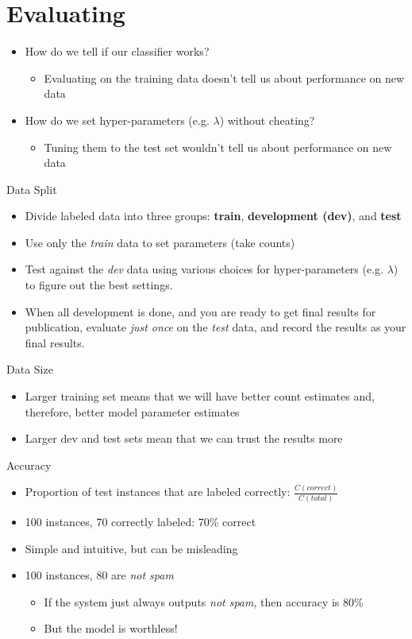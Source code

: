 \documentclass[11pt,letterpaper]{article}
\begin{document}
\section{Evaluating}

\begin{itemize}
  \item How do we tell if our classifier works?
    \begin{itemize}
      \item Evaluating on the training data doesn't tell us about performance on new data
    \end{itemize}
  \item How do we set hyper-parameters (e.g. $\lambda$) without cheating?
    \begin{itemize}
      \item Tuning them to the test set wouldn't tell us about performance on new data
    \end{itemize}
\end{itemize}


Data Split

\begin{itemize}
  \item Divide labeled data into three groups: \textbf{train}, \textbf{development (dev)}, and \textbf{test}
  \item Use only the \textit{train} data to set parameters (take counts)
  \item Test against the \textit{dev} data using various choices for hyper-parameters (e.g. $\lambda$) to figure out the best settings.
  \item When all development is done, and you are ready to get final results for publication, evaluate \textit{just once} on the \textit{test} data, and record the results as your final results.
\end{itemize}


Data Size

\begin{itemize}
  \item Larger training set means that we will have better count estimates and, therefore, better model parameter estimates
  \item Larger dev and test sets mean that we can trust the results more
\end{itemize}


Accuracy

\begin{itemize}
  \item Proportion of test instances that are labeled correctly: $\frac{C(correct)}{C(total)}$
  \item 100 instances, 70 correctly labeled: 70\% correct
  \item Simple and intuitive, but can be misleading
  \item 100 instances, 80 are \textit{not spam}
    \begin{itemize}
      \item If the system just always outputs \textit{not spam}, then accuracy is 80\%
      \item But the model is worthless!
    \end{itemize}
\end{itemize}
\end{document}
